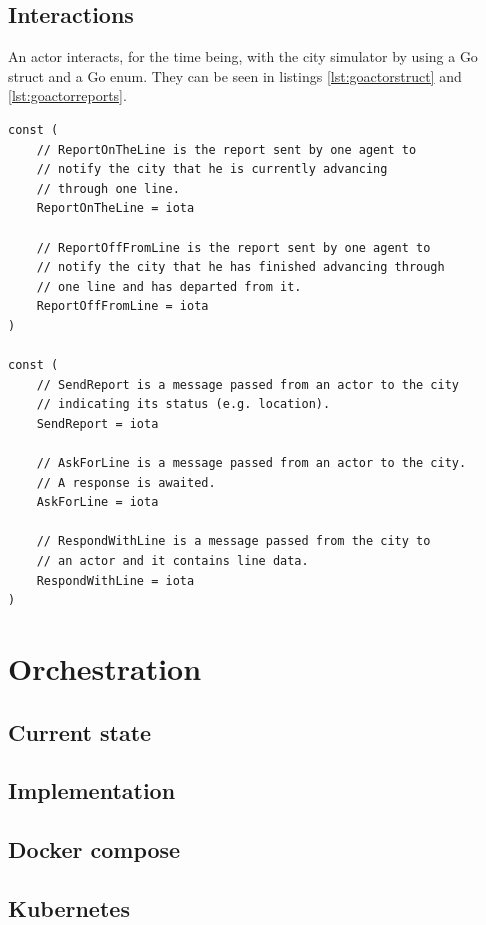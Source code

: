 \documentclass[conference]{IEEEtran}
\begin{document}
\subsection{Interactions}

An actor interacts, for the time being, with the city simulator by using a Go struct and a Go enum. They can be seen in listings \ref{lst:goactorstruct} and \ref{lst:goactorreports}.

\begin{lstlisting}[caption=Go struct for actor's report, label=lst:goactorreports]
const (   
    // ReportOnTheLine is the report sent by one agent to
    // notify the city that he is currently advancing
    // through one line.
    ReportOnTheLine = iota
    
    // ReportOffFromLine is the report sent by one agent to
    // notify the city that he has finished advancing through
    // one line and has departed from it.
    ReportOffFromLine = iota
)
    
const (
    // SendReport is a message passed from an actor to the city
    // indicating its status (e.g. location).
    SendReport = iota
    
    // AskForLine is a message passed from an actor to the city.
    // A response is awaited.
    AskForLine = iota
    
    // RespondWithLine is a message passed from the city to
    // an actor and it contains line data.
    RespondWithLine = iota
)
\end{lstlisting}

\section{Orchestration}

\subsection{Current state}

\subsection{Implementation}

\subsection{Docker compose}

\subsection{Kubernetes}
\end{document}
